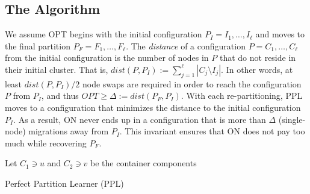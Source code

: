 \documentclass[manuscript,screen=true]{acmart}
\newcommand{\OPT}{\mathit{OPT}}
\DeclarePairedDelimiter\set{\{}{\}}
\begin{document}
\subsection{The Algorithm}
     
We assume OPT begins with the initial configuration
$P_I = I_1, \dots, I_{\ell}$ and moves to the final partition
$P_F = F_1, \dots, F_{\ell}$.
 The \emph{distance} of a configuration $P = C_1, \dots, C_{\ell}$ from the initial configuration is the number of nodes in $P$ that do not reside in their initial cluster.
    That is,
    $\mathit{dist}(P, P_I) := \sum_{j=1}^{\ell} | C_j \setminus I_j |$. 
In other words,
at least $\mathit{dist}(P, P_I)/2$ node swaps are required in order to reach the configuration $P$ from $P_I$, and thus
$\OPT \geq \Delta:= dist(P_F, P_I) $.
 With each re-partitioning,
  PPL moves to a configuration that minimizes the distance to the initial configuration $P_I$.
As a result,
ON never ends up in a configuration that is more than $\Delta$ (single-node) migrations away from $P_I$.
This invariant ensures that ON does not pay too much while recovering $P_F$.

\begin{algorithm}
    \renewcommand{\algorithmicrequire}{\textbf{Input:}}
    \renewcommand{\algorithmicensure}{\textbf{Output:}}
    \begin{algorithmic}
         \label{line:initcomponents}
        \STATE Let $C_1 \ni u$ and $C_2 \ni v$ be the container components
         \label{line:mergecomponents}
        \label{line:rebalance} 
        \ENDIF
        \ENDIF
        \ENDFOR
    \end{algorithmic}
    \caption{Perfect Partition Learner (PPL)}
    \label{alg:ppl}
      \end{algorithm}
  
\end{document}
